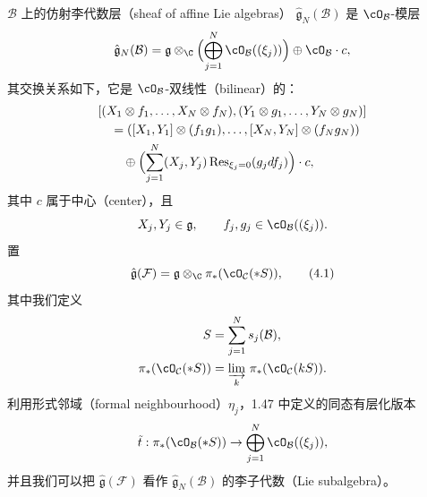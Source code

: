 \begin{definition}[4.1]
$\mathcal{B}$ 上的仿射李代数层（sheaf of affine Lie algebras）
$\hat{\mathfrak{g}}_N(\mathcal{B})$ 是 $\cO_\mathcal{B}$-模层
\[
  \hat{\mathfrak{g}}_N(\mathcal{B})
  = \mathfrak{g}\otimes_\C\Bigl(\bigoplus_{j=1}^N
    \cO_\mathcal{B}((\xi_j))\Bigr)\oplus\cO_\mathcal{B}\cdot c ,
\]
其交换关系如下，它是 $\cO_\mathcal{B}$-双线性（bilinear）的：
\[
  \begin{aligned}
  &[(X_1\otimes f_1,\dots,X_N\otimes f_N),
    (Y_1\otimes g_1,\dots,Y_N\otimes g_N)]\\
  &\quad = ([X_1,Y_1]\otimes(f_1g_1),\dots,[X_N,Y_N]\otimes(f_Ng_N))\\
  &\qquad \oplus\Bigl(\sum_{j=1}^N(X_j,Y_j)
    \operatorname{Res}_{\xi_j=0}(g_jdf_j)\Bigr)\cdot c ,
  \end{aligned}
\]
其中 $c$ 属于中心（center），且
\[
  X_j,Y_j\in\mathfrak{g},\qquad f_j,g_j\in\cO_\mathcal{B}((\xi_j)) .
\]
置
\begin{equation}
  \hat{\mathfrak{g}}(\mathcal{F})
  = \mathfrak{g}\otimes_\C\pi_*(\cO_\mathcal{C}(*S)), \tag{4.1}
\end{equation}
其中我们定义
\[
  \begin{aligned}
  S &= \sum_{j=1}^N s_j(\mathcal{B}),\\
  \pi_*(\cO_\mathcal{C}(*S)) &= \varinjlim_k\,\pi_*(\cO_\mathcal{C}(kS)) .
  \end{aligned}
\]
利用形式邻域（formal neighbourhood）$\eta_j$，1.47 中定义的同态有层化版本
\[
  \tilde{t} : \pi_*(\cO_\mathcal{B}(*S))\to\bigoplus_{j=1}^N
  \cO_\mathcal{B}((\xi_j)) ,
\]
并且我们可以把 $\hat{\mathfrak{g}}(\mathcal{F})$ 看作
$\hat{\mathfrak{g}}_N(\mathcal{B})$ 的李子代数（Lie subalgebra）。
\end{definition}

